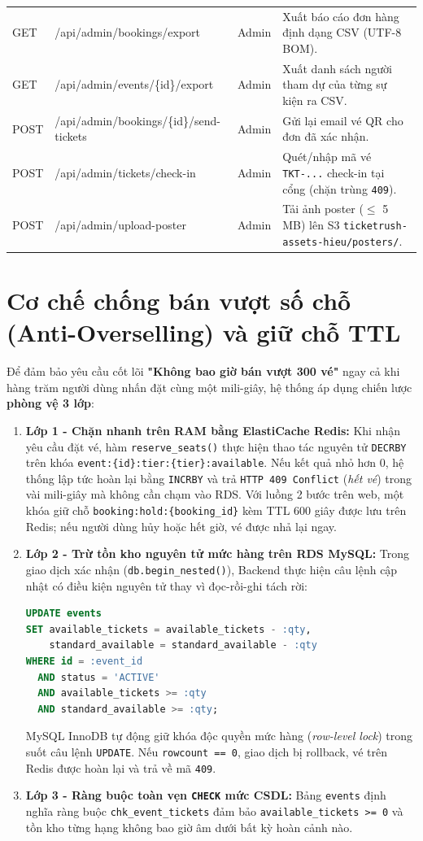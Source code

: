 {\begin{longtable}{>{\ttfamily}l >{\ttfamily}l l >{\raggedright\arraybackslash}p{5.5cm}}
  GET & /api/admin/bookings/export & Admin & Xuất báo cáo đơn hàng định dạng CSV (UTF-8 BOM). \\
  GET & /api/admin/events/\{id\}/export & Admin & Xuất danh sách người tham dự của từng sự kiện ra CSV. \\
  POST & /api/admin/bookings/\{id\}/send-tickets & Admin & Gửi lại email vé QR cho đơn đã xác nhận. \\
  POST & /api/admin/tickets/check-in & Admin & Quét/nhập mã vé \texttt{TKT-...} check-in tại cổng (chặn trùng \texttt{409}). \\
  POST & /api/admin/upload-poster & Admin & Tải ảnh poster ($\le$ 5 MB) lên S3 \texttt{ticketrush-assets-hieu/posters/}. \\
\end{longtable}
}

\section{Cơ chế chống bán vượt số chỗ (Anti-Overselling) và giữ chỗ TTL}
Để đảm bảo yêu cầu cốt lõi \textbf{"Không bao giờ bán vượt 300 vé"} ngay cả khi hàng trăm người dùng nhấn đặt cùng một mili-giây, hệ thống áp dụng chiến lược \textbf{phòng vệ 3 lớp}:

\begin{enumerate}[leftmargin=1.5em]
  \item \textbf{Lớp 1 - Chặn nhanh trên RAM bằng ElastiCache Redis:}
    Khi nhận yêu cầu đặt vé, hàm \texttt{reserve\_seats()} thực hiện thao tác nguyên tử \texttt{DECRBY} trên khóa \texttt{event:\{id\}:tier:\{tier\}:available}. Nếu kết quả nhỏ hơn 0, hệ thống lập tức hoàn lại bằng \texttt{INCRBY} và trả \texttt{HTTP 409 Conflict} (\textit{hết vé}) trong vài mili-giây mà không cần chạm vào RDS. Với luồng 2 bước trên web, một khóa giữ chỗ \texttt{booking:hold:\{booking\_id\}} kèm TTL 600 giây được lưu trên Redis; nếu người dùng hủy hoặc hết giờ, vé được nhả lại ngay.
  \item \textbf{Lớp 2 - Trừ tồn kho nguyên tử mức hàng trên RDS MySQL:}
    Trong giao dịch xác nhận (\texttt{db.begin\_nested()}), Backend thực hiện câu lệnh cập nhật có điều kiện nguyên tử thay vì đọc-rồi-ghi tách rời:
\begin{lstlisting}[language=SQL, caption={Câu lệnh cập nhật tồn kho nguyên tử chống tranh chấp trên RDS MySQL}]
UPDATE events
SET available_tickets = available_tickets - :qty,
    standard_available = standard_available - :qty
WHERE id = :event_id
  AND status = 'ACTIVE'
  AND available_tickets >= :qty
  AND standard_available >= :qty;
\end{lstlisting}
    MySQL InnoDB tự động giữ khóa độc quyền mức hàng (\textit{row-level lock}) trong suốt câu lệnh \texttt{UPDATE}. Nếu \texttt{rowcount == 0}, giao dịch bị rollback, vé trên Redis được hoàn lại và trả về mã \texttt{409}.
  \item \textbf{Lớp 3 - Ràng buộc toàn vẹn \texttt{CHECK} mức CSDL:}
    Bảng \texttt{events} định nghĩa ràng buộc \texttt{chk\_event\_tickets} đảm bảo \texttt{available\_tickets >= 0} và tồn kho từng hạng không bao giờ âm dưới bất kỳ hoàn cảnh nào.
\end{enumerate}

